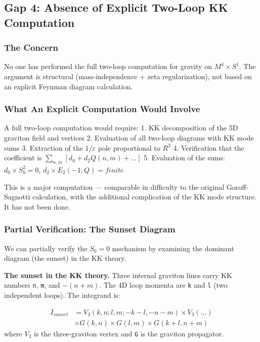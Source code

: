 \documentclass[aps,prd,preprint,superscriptaddress,longbibliography,floatfix]{revtex4-2}
\theoremstyle{remark}
\begin{document}
\subsection{Gap 4: Absence of Explicit Two-Loop KK Computation}


\subsubsection{The Concern}

No one has performed the full two-loop computation for gravity on $M^{4} \times S^{1}$. The argument is structural (mass-independence + zeta regularization), not based on an explicit Feynman diagram calculation.


\subsubsection{What An Explicit Computation Would Involve}

A full two-loop computation would require: 1. KK decomposition of the 5D graviton field and vertices 2. Evaluation of all two-loop diagrams with KK mode sums 3. Extraction of the $1/\varepsilon$ pole proportional to $R^{3}$ 4. Verification that the coefficient is $\sum_{n,m} [d_{0} + d_{2} Q(n,m) + ...]$ 5. Evaluation of the sums: $d_{0} \times S_{0}^{2} = 0$, $d_{2} \times E_{2}(-1; Q) = finite$

This is a major computation --- comparable in difficulty to the original Goroff-Sagnotti calculation, with the additional complication of the KK mode structure. It has not been done.


\subsubsection{Partial Verification: The Sunset Diagram}

We can partially verify the $S_{0} = 0$ mechanism by examining the dominant diagram (the sunset) in the KK theory.

\textbf{The sunset in the KK theory.} Three internal graviton lines carry KK numbers \texttt{n}, \texttt{m}, and $-(n + m)$. The 4D loop momenta are \texttt{k} and \texttt{l} (two independent loops). The integrand is:


\begin{align}
    I_{sunset} &= V_{3}(k, n; l, m; -k-l, -n-m) \times V_{3}(...) \\
    & \times G(k, n) \times G(l, m) \times G(k+l, n+m)
\end{align}
where $V_{3}$ is the three-graviton vertex and \texttt{G} is the graviton propagator.
\end{document}
